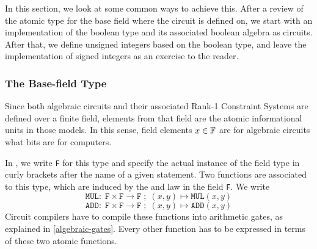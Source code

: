 In this section, we look at some common ways to achieve this. After a review of the atomic type for the base field where the circuit is defined on, we start with an implementation of the boolean type and its associated boolean algebra as circuits. After that, we define unsigned integers based on the boolean type, and leave the implementation of signed integers as an exercise to the reader. 

\subsubsection{The Base-field Type} 
\label{def:base_field_type}
Since both algebraic circuits and their associated Rank-1 Constraint Systems are defined over a finite field, elements from that field are the atomic informational units in those models. In this sense, field elements $x\in \mathbb{F}$ are for algebraic circuits what bits are for computers. 

In , we write \texttt{F} for this type and specify the actual instance of the field type in curly brackets after the name of a given statement. Two functions are associated to this type, which are induced by the  and  law in the field \texttt{F}. We write
\begin{equation}
\mathtt{MUL}:\; \mathtt{F} \times \mathtt{F} \to \mathtt{F}\;;\; (x,y) \mapsto \mathtt{MUL}(x,y)
\end{equation}
\begin{equation}
\mathtt{ADD}:\; \mathtt{F} \times \mathtt{F} \to \mathtt{F}\;;\; (x,y) \mapsto \mathtt{ADD}(x,y)
\end{equation}
Circuit compilers have to compile these functions into arithmetic gates, as explained in \ref{algebraic-gates}. Every other function has to be expressed in terms of these two atomic functions.

